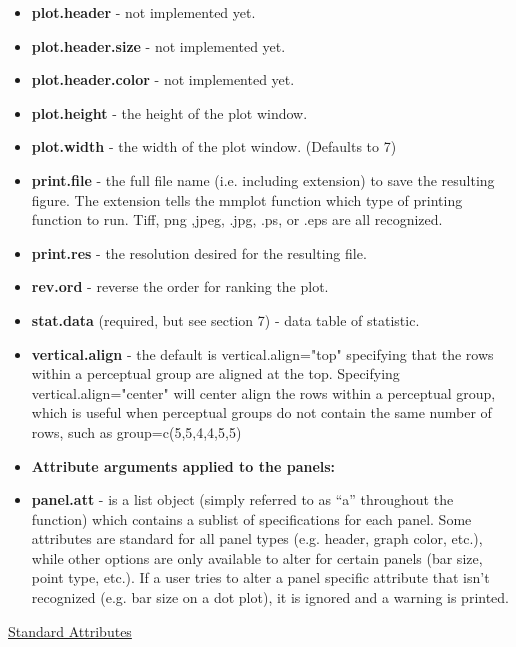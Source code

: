 \documentclass{article}
\begin{document}
\begin{itemize}
\item  \textbf{plot.header} - not implemented yet.
\item  \textbf{plot.header.size} - not implemented yet.
\item  \textbf{plot.header.color} - not implemented yet.
\item  \textbf{plot.height} - the height of the plot window.
\item  \textbf{plot.width} - the width of the plot window. (Defaults to 7)
\item  \textbf{print.file} - the full file name (i.e. including extension) to save the resulting figure. The extension tells the mmplot function which type of printing function to run. Tiff, png ,jpeg, .jpg, .ps, or .eps are all recognized.
\item  \textbf{print.res} - the resolution desired for the resulting file.
\item  \textbf{rev.ord} - reverse the order for ranking the plot.
\item  \textbf{stat.data} (required, but see section 7) - data table of statistic.
\item  \textbf{vertical.align} - the default is vertical.align="top" specifying that the rows within a perceptual group are aligned at the top.  Specifying vertical.align="center" will center align the rows within a perceptual group, which is useful when perceptual groups do not contain the same number of rows, such as group=c(5,5,4,4,5,5)
\item  \textbf{Attribute arguments applied to the panels:}
\item  \textbf{panel.att} - is a list object (simply referred to as ``a'' throughout the function) which contains a sublist of
specifications for each panel. Some attributes are standard for all panel types (e.g. header, graph color, etc.), while
other options are only available to alter for certain panels (bar size, point type, etc.). If a user tries to alter a panel
specific attribute that isn't recognized (e.g. bar size on a dot plot), it is ignored and a warning is printed.
\end{itemize}
\underline{Standard Attributes}
\end{document}
